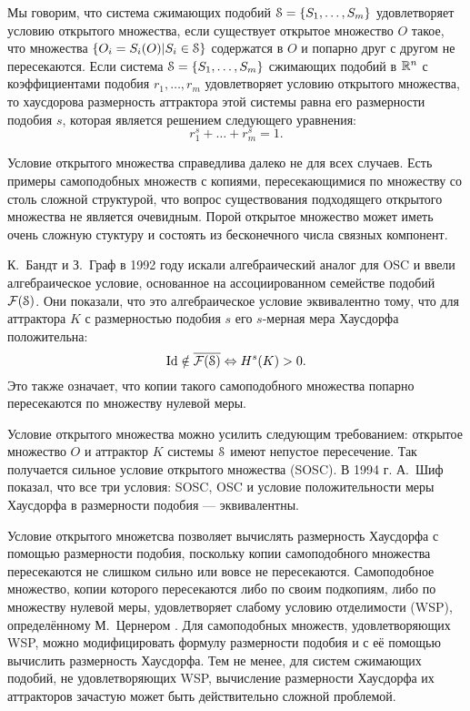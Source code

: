 Мы говорим, что система сжимающих подобий ${\EuScript S}=\{S_1, \ldots, S_m\}$ удовлетворяет условию открытого множества, если существует открытое множество $O$ такое, что множества $\{O_i=S_i(O) | S_i\in{\EuScript S}\}$ содержатся в $O$ и попарно друг с другом не пересекаются.
Если система ${\EuScript S}=\{S_1,\ldots,S_m\}$ сжимающих подобий в $\mathbb{R}^n$ с коэффициентами подобия $r_1, \ldots, r_m$ удовлетворяет условию открытого множества, то хаусдорова размерность аттрактора этой системы равна его размерности подобия $s$, которая является решением следующего уравнения: $$r_1^s+\ldots+r_m^s=1.$$ 

Условие открытого множества справедлива далеко не для всех случаев.
Есть примеры самоподобных множеств с копиями, пересекающимися по множеству со столь сложной структурой, что вопрос существования подходящего открытого множества не является очевидным.
Порой открытое множество может иметь очень сложную стуктуру и состоять из бесконечного числа связных компонент.

К.~Бандт и З.~Граф в 1992 году \cite{SSS7} искали алгебраический аналог для OSC и ввели алгебраическое условие, основанное на ассоциированном семействе подобий $\mathcal{F}({\EuScript S})$. 
Они показали, что это алгебраическое условие эквивалентно тому, что для аттрактора $K$ с размерностью подобия $s$ его $s$-мерная мера Хаусдорфа положительна:
$$\mathop{\rm Id} \nolimits\notin\overline{\mathcal{F}({\EuScript S})} \Leftrightarrow H^s(K)>0.$$
Это также означает, что копии такого самоподобного множества попарно пересекаются по множеству нулевой меры.

Условие открытого множества можно усилить следующим требованием: открытое множество $O$ и аттрактор $K$ системы ${\EuScript S}$ имеют непустое пересечение. 
Так получается сильное условие открытого множества (SOSC).
В 1994 г. А.~Шиф \cite{Schief1994} показал, что все три условия: SOSC, OSC и условие положительности меры Хаусдорфа в размерности подобия --- эквивалентны.

Условие открытого множетсва позволяет вычислять размерность Хаусдорфа с помощью размерности подобия, поскольку копии самоподобного множества пересекаются не слишком сильно или вовсе не пересекаются.
Самоподобное множество, копии которого пересекаются либо по своим подкопиям, либо по множеству нулевой меры, удовлетворяет слабому условию отделимости (WSP), определённому М.~Цернером \cite{Zerner1996}.
Для самоподобных множеств, удовлетворяющих WSP, можно модифицировать формулу размерности подобия и с её помощью вычислить размерность Хаусдорфа.
Тем не менее, для систем сжимающих подобий, не удовлетворяющих WSP, вычисление размерности Хаусдорфа их аттракторов зачастую может быть действительно сложной проблемой.\\

